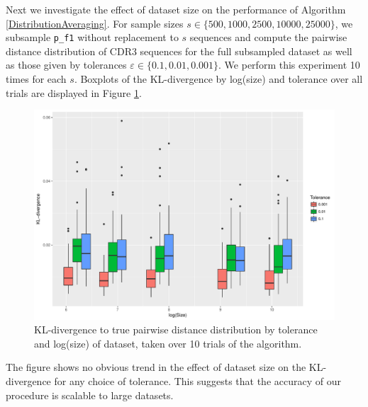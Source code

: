 \documentclass{article}
\begin{document}
Next we investigate the effect of dataset size on the performance of Algorithm \ref{DistributionAveraging}.
For sample sizes $s \in \{500, 1000, 2500, 10000, 25000\}$, we subsample \texttt{p\_f1} without replacement to $s$ sequences and compute the pairwise distance distribution of CDR3 sequences for the full subsampled dataset as well as those given by tolerances $\varepsilon \in \{0.1, 0.01, 0.001\}$.  
We perform this experiment 10 times for each $s$.
Boxplots of the KL-divergence by log(size) and tolerance over all trials are displayed in Figure \ref{fig:Sizes}.
\begin{figure}
    \includegraphics[width=\linewidth]{Figures/div_by_size_and_tol.pdf}
    \caption{KL-divergence to true pairwise distance distribution by tolerance and log(size) of dataset, taken over 10 trials of the algorithm.}
    \label{fig:Sizes}
\end{figure}
The figure shows no obvious trend in the effect of dataset size on the KL-divergence for any choice of tolerance.
This suggests that the accuracy of our procedure is scalable to large datasets.
\end{document}
